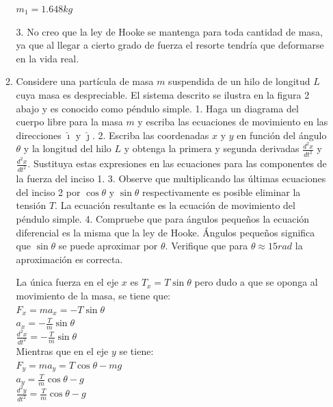 \documentclass[10pt, a4paper]{article}
\begin{document}
\begin{enumerate}
\begin{enumerate}
\begin{center}
                $m_1=1.648\si{kg}$
            \end{center}

            3. No creo que la ley de Hooke se mantenga para toda cantidad de masa, ya que al llegar a cierto grado de fuerza
            el resorte tendría que deformarse en la vida real. 

            \item Considere una partícula de masa $m$ suspendida de un hilo de longitud $L$ cuya
            masa es despreciable. El sistema descrito se ilustra en la figura 2 abajo y es
            conocido como péndulo simple. 1. Haga un diagrama del cuerpo libre para la
            masa $m$ y escriba las ecuaciones de movimiento en las direcciones $\hat\imath$ y $\hat\jmath$. 2.
            Escriba las coordenadas $x$ y $y$ en función del ángulo $\theta$ y la longitud del hilo $L$
            y obtenga la primera y segunda derivadas $\frac{d^2x}{dt^2}$ y $\frac{d^2x}{dt^2}$. Sustituya estas
            expresiones en las ecuaciones para las componentes de la fuerza del inciso 1. 3.
            Observe que multiplicando las últimas ecuaciones del inciso 2 por $\cos\theta$ y $\sin\theta$
            respectivamente es posible eliminar la tensión $T$. La ecuación resultante es la
            ecuación de movimiento del péndulo simple. 4. Compruebe que para ángulos
            pequeños la ecuación diferencial es la misma que la ley de Hooke. Ángulos
            pequeños significa que $\sin\theta$ se puede aproximar por $\theta$. Verifique que para $\theta \approx 15 \si{rad}$ 
            la aproximación es correcta.

            \begin{center}
                La única fuerza en el eje $x$ es $T_x=T\sin\theta$ pero dudo a que se oponga al movimiento de 
                la masa, se tiene que:\\
                $F_x=ma_x=-T\sin\theta$\\
                $a_x=-\frac{T}{m}\sin\theta$\\
                $\frac{d^2x}{dt^2}=-\frac{T}{m}\sin\theta$\\

                Mientras que en el eje $y$ se tiene:\\
                $F_y=ma_y=T\cos\theta-mg$\\
                $a_y=\frac{T}{m}\cos\theta-\si{g}$\\
                $\frac{d^2y}{dt^2}=\frac{T}{m}\cos\theta-\si{g}$


\end{center}
\end{enumerate}
\end{enumerate}
\end{document}

